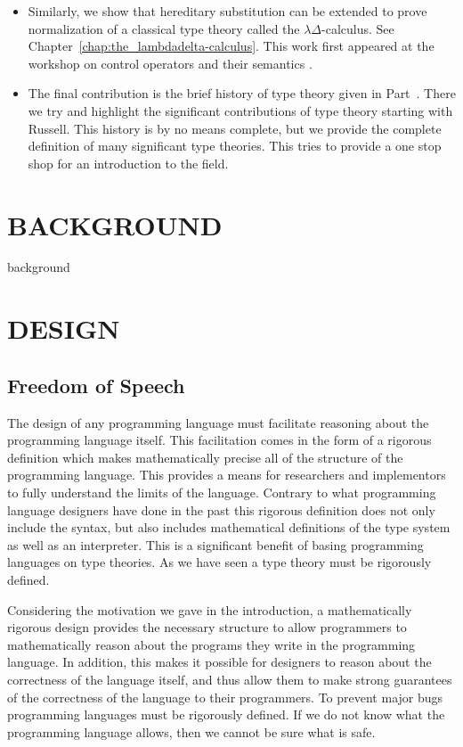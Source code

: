 \documentclass[phd,dedicationpage,ackpage,epigraphpage,figures]{uithesis}
\begin{document}
\begin{itemize}
\item Similarly, we show that hereditary substitution can be extended
  to prove normalization of a classical type theory called the
  $\lambda\Delta$-calculus. See
  Chapter~\ref{chap:the_lambdadelta-calculus}.  This work first
  appeared at the workshop on control operators and their semantics
  \cite{Eades:2013}.

\item The final contribution is the brief history of type theory given
  in Part~\ref{part:background}.  There we try and highlight the
  significant contributions of type theory starting with Russell.
  This history is by no means complete, but we provide the complete
  definition of many significant type theories.  This tries to provide
  a one stop shop for an introduction to the field.
\end{itemize}

\part{BACKGROUND}          
\label{part:background}
{background}

\part{DESIGN}
\label{part:design}

\chapter{Freedom of Speech}
\label{chap:freedom_of_speech}
The design of any programming language must facilitate reasoning about
the programming language itself.  This facilitation comes in the form
of a rigorous definition which makes mathematically precise all of the
structure of the programming language.  This provides a means for
researchers and implementors to fully understand the limits of the
language.  Contrary to what programming language designers have done
in the past this rigorous definition does not only include the syntax,
but also includes mathematical definitions of the type system as well
as an interpreter. This is a significant benefit of basing programming
languages on type theories.  As we have seen a type theory must be
rigorously defined.  

Considering the motivation we gave in the introduction, a
mathematically rigorous design provides the necessary structure to
allow programmers to mathematically reason about the programs they
write in the programming language.  In addition, this makes it
possible for designers to reason about the correctness of the language
itself, and thus allow them to make strong guarantees of the
correctness of the language to their programmers.  To prevent major
bugs programming languages must be rigorously defined.  If we do not
know what the programming language allows, then we cannot be sure what
is safe.
\end{document}
